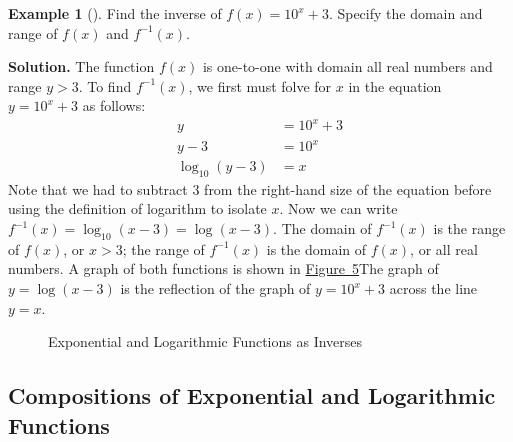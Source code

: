 \documentclass[10pt,]{book}
\theoremstyle{plain}
\theoremstyle{definition}
\theoremstyle{definition}
\newtheorem{example}[theorem]{Example}
\theoremstyle{definition}
\numberwithin{equation}{section}
\newcommand{\amp}{&}
\begin{document}
\begin{example}[]\label{example-25}
\hypertarget{p-329}{}%
Find the inverse of \(f(x) = 10^x + 3\). Specify the domain and range of \(f(x)\) and \(f^{-1}(x)\).%
\par\smallskip%
\noindent\textbf{Solution.}\hypertarget{solution-25}{}\quad%
\hypertarget{p-330}{}%
The function \(f(x)\) is one-to-one with domain all real numbers and range \(y > 3\). To find \(f^{-1}(x)\), we first must folve for \(x\) in the equation \(y = 10^x + 3\) as follows:%
\begin{align*}
y \amp= 10^x + 3\\
y - 3 \amp= 10^x\\
\log_{10} \left( y - 3 \right) \amp= x
\end{align*}
Note that we had to subtract \(3\) from the right-hand size of the equation before using the definition of logarithm to isolate \(x\). Now we can write \(f^{-1}(x) = \log_{10} \left( x - 3 \right) = \log \left( x - 3 \right) \). The domain of \(f^{-1}(x)\) is the range of \(f(x)\), or \(x > 3\); the range of \(f^{-1}(x)\) is the domain of \(f(x)\), or all real numbers. A graph of both functions is shown in \hyperref[exponential-log-inverses-example]{Figure~5}The graph of \(y = \log \left( x - 3 \right)\) is the reflection of the graph of \(y = 10^x + 3\) across the line \(y = x\).%
\begin{figure}
\centering
{
}
\caption{Exponential and Logarithmic Functions as Inverses\label{exponential-log-inverses-example}}
\end{figure}
\end{example}
\typeout{************************************************}
\typeout{************************************************}
\subsection[{Compositions of Exponential and Logarithmic Functions}]{Compositions of Exponential and Logarithmic Functions}\label{subsection-3}
\hypertarget{p-331}{}%
%
\typeout{************************************************}
\typeout{************************************************}
\end{document}
